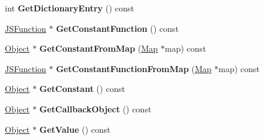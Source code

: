 \begin{DoxyCompactItemize}
\item 
\hypertarget{classv8_1_1internal_1_1_b_a_s_e___e_m_b_e_d_d_e_d_a0081d6986b13e93f3fa487ce162f3f08}{}int {\bfseries Get\+Dictionary\+Entry} () const \label{classv8_1_1internal_1_1_b_a_s_e___e_m_b_e_d_d_e_d_a0081d6986b13e93f3fa487ce162f3f08}

\item 
\hypertarget{classv8_1_1internal_1_1_b_a_s_e___e_m_b_e_d_d_e_d_ac3b603ccf2e836ff7e6d44de3343b879}{}\hyperlink{classv8_1_1internal_1_1_j_s_function}{J\+S\+Function} $\ast$ {\bfseries Get\+Constant\+Function} () const \label{classv8_1_1internal_1_1_b_a_s_e___e_m_b_e_d_d_e_d_ac3b603ccf2e836ff7e6d44de3343b879}

\item 
\hypertarget{classv8_1_1internal_1_1_b_a_s_e___e_m_b_e_d_d_e_d_a9348b97b9ced069c30b87cb03065f64e}{}\hyperlink{classv8_1_1internal_1_1_object}{Object} $\ast$ {\bfseries Get\+Constant\+From\+Map} (\hyperlink{classv8_1_1internal_1_1_map}{Map} $\ast$map) const \label{classv8_1_1internal_1_1_b_a_s_e___e_m_b_e_d_d_e_d_a9348b97b9ced069c30b87cb03065f64e}

\item 
\hypertarget{classv8_1_1internal_1_1_b_a_s_e___e_m_b_e_d_d_e_d_a570bfab97c78cb90607b07a4ffd095c4}{}\hyperlink{classv8_1_1internal_1_1_j_s_function}{J\+S\+Function} $\ast$ {\bfseries Get\+Constant\+Function\+From\+Map} (\hyperlink{classv8_1_1internal_1_1_map}{Map} $\ast$map) const \label{classv8_1_1internal_1_1_b_a_s_e___e_m_b_e_d_d_e_d_a570bfab97c78cb90607b07a4ffd095c4}

\item 
\hypertarget{classv8_1_1internal_1_1_b_a_s_e___e_m_b_e_d_d_e_d_a992a0a6f652230c025d050533f88de9d}{}\hyperlink{classv8_1_1internal_1_1_object}{Object} $\ast$ {\bfseries Get\+Constant} () const \label{classv8_1_1internal_1_1_b_a_s_e___e_m_b_e_d_d_e_d_a992a0a6f652230c025d050533f88de9d}

\item 
\hypertarget{classv8_1_1internal_1_1_b_a_s_e___e_m_b_e_d_d_e_d_a27d1ac2718119ecd07239393d7a8c9c8}{}\hyperlink{classv8_1_1internal_1_1_object}{Object} $\ast$ {\bfseries Get\+Callback\+Object} () const \label{classv8_1_1internal_1_1_b_a_s_e___e_m_b_e_d_d_e_d_a27d1ac2718119ecd07239393d7a8c9c8}

\item 
\hypertarget{classv8_1_1internal_1_1_b_a_s_e___e_m_b_e_d_d_e_d_a0239aa90ba633001e55f2209d2cef086}{}\hyperlink{classv8_1_1internal_1_1_object}{Object} $\ast$ {\bfseries Get\+Value} () const \label{classv8_1_1internal_1_1_b_a_s_e___e_m_b_e_d_d_e_d_a0239aa90ba633001e55f2209d2cef086}


\end{DoxyCompactItemize}
